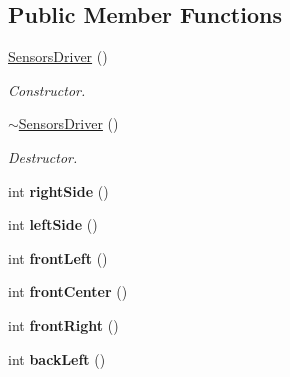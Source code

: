 \subsection*{Public Member Functions}
\begin{DoxyCompactItemize}
\item 
\mbox{\label{classSensorsDriver_a3da0016428e39e04021a7398ddec6cd7}} 
\hyperlink{classSensorsDriver_a3da0016428e39e04021a7398ddec6cd7}{Sensors\+Driver} ()
\begin{DoxyCompactList}\small\item\em Constructor. \end{DoxyCompactList}\item 
\mbox{\label{classSensorsDriver_aeb5bb8554d3bacd1cc267eedc2a8fb4d}} 
\hyperlink{classSensorsDriver_aeb5bb8554d3bacd1cc267eedc2a8fb4d}{$\sim$\+Sensors\+Driver} ()
\begin{DoxyCompactList}\small\item\em Destructor. \end{DoxyCompactList}\item 
\mbox{\label{classSensorsDriver_ac1c1e82e2e28051147677faf1b002d0a}} 
int {\bfseries right\+Side} ()
\item 
\mbox{\label{classSensorsDriver_af30421d64581a0094f2762cf506032d9}} 
int {\bfseries left\+Side} ()
\item 
\mbox{\label{classSensorsDriver_ad9f2ff84de03a165c10848f8d9f21930}} 
int {\bfseries front\+Left} ()
\item 
\mbox{\label{classSensorsDriver_a3378e277cfb43319eb7b59b9b3fe3d12}} 
int {\bfseries front\+Center} ()
\item 
\mbox{\label{classSensorsDriver_a42e9d37f155cadf71e325bed5f46741e}} 
int {\bfseries front\+Right} ()
\item 
\mbox{\label{classSensorsDriver_ae0b9ea28342e6b59bbb2f9bfe187e839}} 
int {\bfseries back\+Left} ()
\item 
\mbox{\label{classSensorsDriver_ab2f96ed01fb916197ffb8906a6796c97}} 

\end{DoxyCompactItemize}
